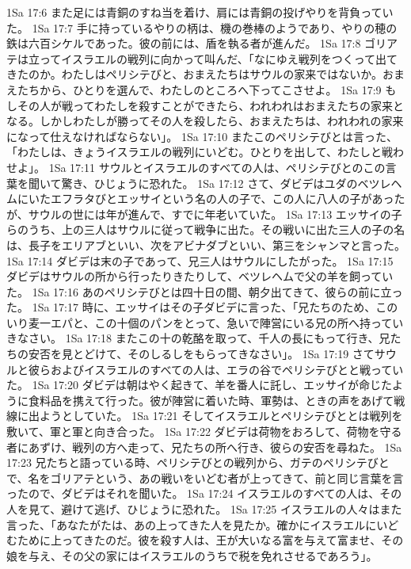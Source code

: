 1Sa 17:6  また足には青銅のすね当を着け、肩には青銅の投げやりを背負っていた。
1Sa 17:7  手に持っているやりの柄は、機の巻棒のようであり、やりの穂の鉄は六百シケルであった。彼の前には、盾を執る者が進んだ。
1Sa 17:8  ゴリアテは立ってイスラエルの戦列に向かって叫んだ、「なにゆえ戦列をつくって出てきたのか。わたしはペリシテびと、おまえたちはサウルの家来ではないか。おまえたちから、ひとりを選んで、わたしのところへ下ってこさせよ。
1Sa 17:9  もしその人が戦ってわたしを殺すことができたら、われわれはおまえたちの家来となる。しかしわたしが勝ってその人を殺したら、おまえたちは、われわれの家来になって仕えなければならない」。
1Sa 17:10  またこのペリシテびとは言った、「わたしは、きょうイスラエルの戦列にいどむ。ひとりを出して、わたしと戦わせよ」。
1Sa 17:11  サウルとイスラエルのすべての人は、ペリシテびとのこの言葉を聞いて驚き、ひじょうに恐れた。
1Sa 17:12  さて、ダビデはユダのベツレヘムにいたエフラタびとエッサイという名の人の子で、この人に八人の子があったが、サウルの世には年が進んで、すでに年老いていた。
1Sa 17:13  エッサイの子らのうち、上の三人はサウルに従って戦争に出た。その戦いに出た三人の子の名は、長子をエリアブといい、次をアビナダブといい、第三をシャンマと言った。
1Sa 17:14  ダビデは末の子であって、兄三人はサウルにしたがった。
1Sa 17:15  ダビデはサウルの所から行ったりきたりして、ベツレヘムで父の羊を飼っていた。
1Sa 17:16  あのペリシテびとは四十日の間、朝夕出てきて、彼らの前に立った。
1Sa 17:17  時に、エッサイはその子ダビデに言った、「兄たちのため、このいり麦一エパと、この十個のパンをとって、急いで陣営にいる兄の所へ持っていきなさい。
1Sa 17:18  またこの十の乾酪を取って、千人の長にもって行き、兄たちの安否を見とどけて、そのしるしをもらってきなさい」。
1Sa 17:19  さてサウルと彼らおよびイスラエルのすべての人は、エラの谷でペリシテびとと戦っていた。
1Sa 17:20  ダビデは朝はやく起きて、羊を番人に託し、エッサイが命じたように食料品を携えて行った。彼が陣営に着いた時、軍勢は、ときの声をあげて戦線に出ようとしていた。
1Sa 17:21  そしてイスラエルとペリシテびととは戦列を敷いて、軍と軍と向き合った。
1Sa 17:22  ダビデは荷物をおろして、荷物を守る者にあずけ、戦列の方へ走って、兄たちの所へ行き、彼らの安否を尋ねた。
1Sa 17:23  兄たちと語っている時、ペリシテびとの戦列から、ガテのペリシテびとで、名をゴリアテという、あの戦いをいどむ者が上ってきて、前と同じ言葉を言ったので、ダビデはそれを聞いた。
1Sa 17:24  イスラエルのすべての人は、その人を見て、避けて逃げ、ひじょうに恐れた。
1Sa 17:25  イスラエルの人々はまた言った、「あなたがたは、あの上ってきた人を見たか。確かにイスラエルにいどむために上ってきたのだ。彼を殺す人は、王が大いなる富を与えて富ませ、その娘を与え、その父の家にはイスラエルのうちで税を免れさせるであろう」。
